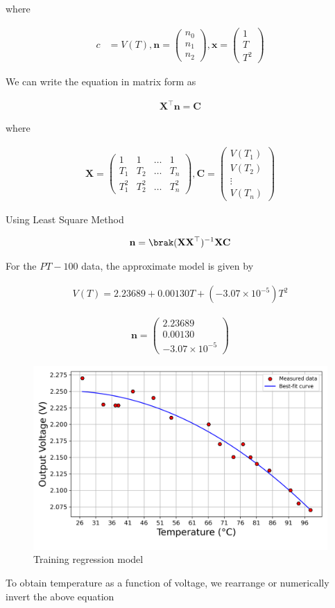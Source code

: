 \documentclass{article}
\let\vec\mathbf
\newcommand{\myvec}[1]{\ensuremath{\begin{pmatrix}#1\end{pmatrix}}}
\begin{document}
where

\begin{align}    
    c &= V(T), \vec{n} = \myvec{n_0 \\ n_1 \\ n_2}, \vec{x} = \myvec{1 \\ T \\ T^2}
\end{align}

We can write the equation in matrix form as

\begin{align}
    \vec{X}^\top \vec{n} = \vec{C}
\end{align}

where

\begin{align}
    \vec{X} = \myvec{1 & 1 & \dots & 1 \\ T_1 & T_2 & \dots & T_n \\ T_1^2 & T_2^2 & \dots & T_n^2},
    \vec{C} = \myvec{V(T_1) \\ V(T_2) \\ \vdots \\ V(T_n)}
\end{align}

Using Least Square Method

\begin{align}
\vec{n} = \brak(\vec{X} \vec{X}^\top)^{-1} \vec{X} \vec{C}
\end{align}

For the $PT-100$ data, the approximate model is given by


\begin{align}
    V(T) = 2.23689 + 0.00130T + (-3.07 \times 10^{-5})T^2
\end{align}

\begin{align}
    \vec{n} = \myvec{2.23689\\ 0.00130 \\ -3.07 \times 10^{-5}}
\end{align}

\begin{figure}
    \centering
    \includegraphics[width=1\linewidth]{figs/train.png}
    \caption{Training regression model}
    \label{fig:placeholder}
\end{figure}
\newpage
To  obtain temperature as a function of voltage, we rearrange or numerically invert the above equation 
\end{document}
